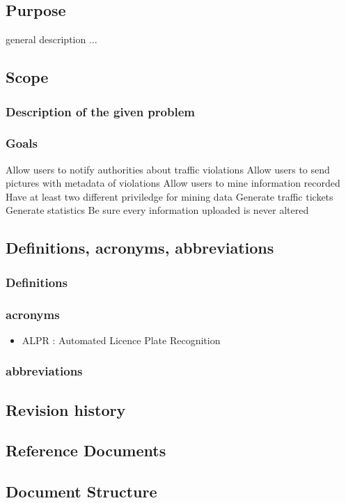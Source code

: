 




\subsection{Purpose}
general description ...

\subsection{Scope}

\subsubsection{Description of the given problem}


\subsubsection{Goals}
\begin{enumerate}
   Allow users to notify authorities about traffic violations
   Allow users to send pictures with metadata of violations
   Allow users to mine information recorded
   Have at least two different  priviledge for mining data
   Generate traffic tickets
   Generate statistics
   Be sure every information uploaded is never altered
\end{enumerate}



\subsection{Definitions,  acronyms,  abbreviations}

\subsubsection{Definitions}
\subsubsection{acronyms}
\begin{itemize}
  \item ALPR : Automated Licence Plate Recognition
\end{itemize}

\subsubsection{abbreviations}


\subsection{Revision history}


\subsection{Reference Documents}



\subsection{Document Structure}
